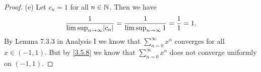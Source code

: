 \begin{proof}{(e)}
  Let \(c_n = 1\) for all \(n \in \mathbb{N}\).
  Then we have
  \[
    \dfrac{1}{\limsup_{n \to \infty} \abs{c_n}} = \dfrac{1}{\limsup_{n \to \infty} 1} = \dfrac{1}{1} = 1.
  \]
  By Lemma 7.3.3 in Analysis I we know that \(\sum_{n = 0}^\infty x^n\) converges for all \(x \in (-1, 1)\).
  But by \cref{3.5.8} we know that \(\sum_{n = 0}^\infty x^n\) does not converge uniformly on \((-1, 1)\).
\end{proof}
